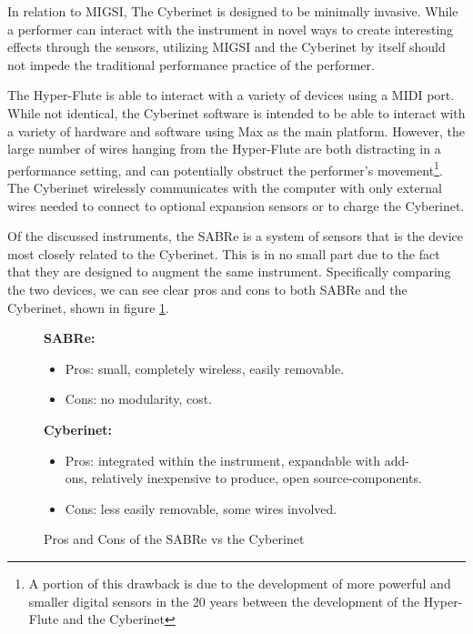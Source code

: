 In relation to MIGSI, The Cyberinet is designed to be minimally invasive. While a performer can interact with the instrument in novel ways to create interesting effects through the sensors, utilizing MIGSI and the Cyberinet by itself should not impede the traditional performance practice of the performer. %

The Hyper-Flute is able to interact with a variety of devices using a MIDI port. While not identical, the Cyberinet software is intended to be able to interact with a variety of hardware and software using Max as the main platform. However, the large number of wires hanging from the Hyper-Flute are both distracting in a performance setting, and can potentially obstruct the performer's movement\footnote{A portion of this drawback is due to the development of more powerful and smaller digital sensors in the 20 years between the development of the Hyper-Flute and the Cyberinet}. The Cyberinet wirelessly communicates with the computer with only external wires needed to connect to optional expansion sensors or to charge the Cyberinet.


Of the discussed instruments, the SABRe is a system of sensors that is the device most closely related to the Cyberinet. This is in no small part due to the fact that they are designed to augment the same instrument. Specifically comparing the two devices, we can see clear pros and cons to both SABRe and the Cyberinet, shown in figure \ref{fig:proCon_SABRe_Cyberinet}.

\begin{figure}
    \centering
   \textbf{SABRe:}

\begin{itemize}
    \item Pros: small, completely wireless, easily removable.
    \item Cons: no modularity, cost.
\end{itemize}

\textbf{Cyberinet:} 

\begin{itemize}
    \item Pros: integrated within the instrument, expandable with add-ons, relatively inexpensive to produce, open source-components.
    \item Cons: less easily removable, some wires involved.
\end{itemize}
    \caption{Pros and Cons of the SABRe vs the Cyberinet}
    \label{fig:proCon_SABRe_Cyberinet}
\end{figure}

